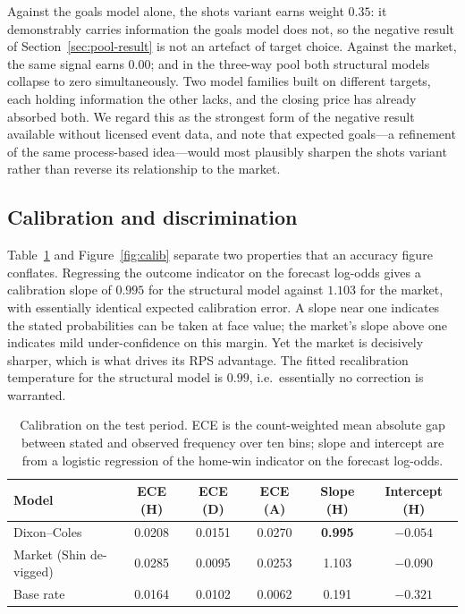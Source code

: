 \documentclass[11pt]{article}
\begin{document}
Against the goals model alone, the shots variant earns weight $0.35$: it
demonstrably carries information the goals model does not, so the negative
result of Section~\ref{sec:pool-result} is not an artefact of target choice.
Against the market, the same signal earns $0.00$; and in the three-way pool
both structural models collapse to zero simultaneously. Two model families
built on different targets, each holding information the other lacks, and the
closing price has already absorbed both. We regard this as the strongest form
of the negative result available without licensed event data, and note that
expected goals---a refinement of the same process-based idea---would most
plausibly sharpen the shots variant rather than reverse its relationship to the
market.

\subsection{Calibration and discrimination}
\label{sec:calibration}

Table~\ref{tab:calib} and Figure~\ref{fig:calib} separate two properties that
an accuracy figure conflates. Regressing the outcome indicator on the forecast
log-odds gives a calibration slope of $0.995$ for the structural model against
$1.103$ for the market, with essentially identical expected calibration error.
A slope near one indicates the stated probabilities can be taken at face value;
the market's slope above one indicates mild under-confidence on this margin.
Yet the market is decisively sharper, which is what drives its RPS advantage.
The fitted recalibration temperature for the structural model is $0.99$, i.e.\
essentially no correction is warranted.

\begin{table}[t]
\centering
\caption{Calibration on the test period. ECE is the count-weighted mean
absolute gap between stated and observed frequency over ten bins; slope and
intercept are from a logistic regression of the home-win indicator on the
forecast log-odds.}
\label{tab:calib}
\small
\begin{tabular}{lccccc}
\toprule
Model & ECE (H) & ECE (D) & ECE (A) & Slope (H) & Intercept (H) \\
\midrule
Dixon--Coles            & 0.0208 & 0.0151 & 0.0270 & \textbf{0.995} & $-0.054$ \\
Market (Shin de-vigged) & 0.0285 & 0.0095 & 0.0253 & 1.103 & $-0.090$ \\
Base rate               & 0.0164 & 0.0102 & 0.0062 & 0.191 & $-0.321$ \\
\bottomrule
\end{tabular}
\end{table}
\end{document}
